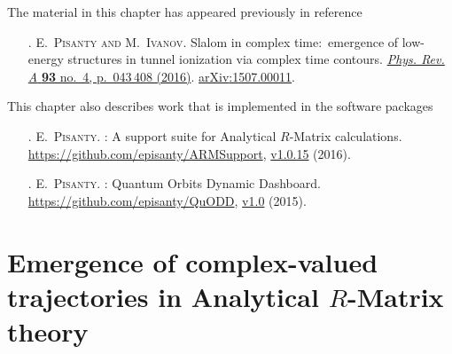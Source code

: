 The material in this chapter has appeared previously in reference
\begin{enumerate}
\item[{\hypersetup{citecolor=black}\citealp{Pisanty_slalom_2016}}.]
\textsc{E.~Pisanty and M.~Ivanov}.
\newblock Slalom in complex time:\ emergence of low-energy structures in tunnel
  ionization via complex time contours.
\newblock \href{http://dx.doi.org/10.1103/PhysRevA.93.043408}{
          \emph{Phys. Rev. A} \textbf{93} no.~4, p.~043\,408 (2016)}.
\newblock \href{http://arxiv.org/abs/1507.00011}{{arXiv}:1507.00011}.
\end{enumerate}
%
%
This chapter also describes work that is implemented in the software packages
\begin{enumerate}
\item[{\hypersetup{citecolor=black}\citealp{ARMSupport}}.]
\textsc{E.~Pisanty}.
: {A} support suite for {A}nalytical {$R$}-{M}atrix
  calculations.
\newblock \url{https://github.com/episanty/ARMSupport}, \href{https://doi.org/10.5281/zenodo.164629}{v1.0.15} (2016).


\item[{\hypersetup{citecolor=black}\citealp{QuODD}}.]
\textsc{E.~Pisanty}.
: Quantum Orbits Dynamic Dashboard.
\newblock \url{https://github.com/episanty/QuODD}, \href{https://doi.org/10.5281/zenodo.164633}{v1.0} (2015).
\end{enumerate}





\vfill



\section[Emergence of complex-valued trajectories in Analytical R-Matrix theory]{Emergence of complex-valued trajectories in Analytical $R$-Matrix theory}
\label{sec:emergence-of-complex-trajectories}

